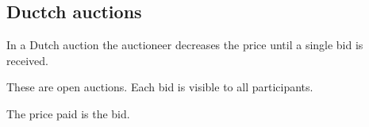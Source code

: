 
\subsection{Ductch auctions}

In a Dutch auction the auctioneer decreases the price until a single bid is received.

These are open auctions. Each bid is visible to all participants.

The price paid is the bid.

